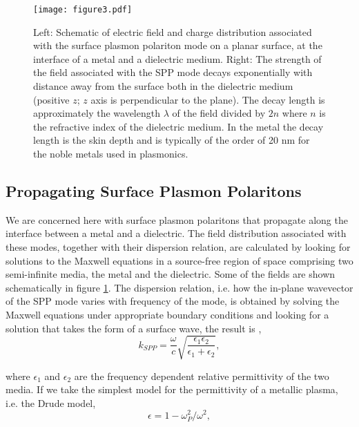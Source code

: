 \documentclass[12pt]{iopart}
\begin{document}
\begin{figure}
\texttt{[image: figure3.pdf]}
\caption{Left: Schematic of electric field and charge distribution associated with the surface plasmon polariton mode on a planar surface, at the interface of a metal and a dielectric medium. Right: The strength of the field associated with the SPP mode decays exponentially with distance away from the surface both in the dielectric medium (positive $z$; $z$ axis is perpendicular to the plane). The decay length is approximately the wavelength $\lambda$ of the field divided by $2n$ where $n$ is the refractive index of the dielectric medium. In the metal the decay length is the skin depth and is typically of the order of 20 nm for the noble metals used in plasmonics.} 
\label{fig_SPP1}
\end{figure}

\subsection{Propagating Surface Plasmon Polaritons} \label{propagationSPP}

We are concerned here with surface plasmon polaritons that propagate along the interface between a metal and a dielectric. The field distribution associated with these modes, together with their dispersion relation, are calculated by looking for solutions to the Maxwell equations in a source-free region of space comprising two semi-infinite media, the metal and the dielectric. Some of the fields are shown schematically in figure \ref{fig_SPP1}. The dispersion relation, i.e. how the in-plane wavevector of the SPP mode varies with frequency of the mode, is obtained by solving the Maxwell equations under appropriate boundary conditions and looking for a solution that takes the form of a surface wave, the result is \cite{Raether},
\\
\begin{equation}
k_{SPP} = \frac{\omega}{c}\sqrt{\frac{\epsilon_1\epsilon_2}{\epsilon_1+\epsilon_2}}, \label{k_SPP}
\end{equation}

\noindent where $\epsilon_1$ and $\epsilon_2$ are the frequency dependent relative permittivity of the two media. If we take the simplest model for the permittivity of a metallic plasma, 
i.e. the Drude model,
\\
\begin{equation}
\epsilon=1-\omega_P^2/\omega^2,
\label{Drude}
\end{equation}
\end{document}
